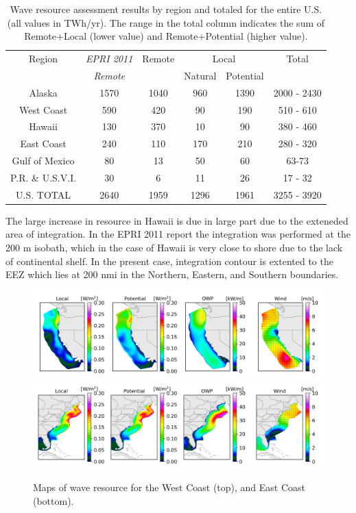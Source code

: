 \begin{table}[ht]
  \centering
  \begin{tabular}{|c|c|c|c|c|c|}
    \hline
    Region & {\it EPRI 2011}  & Remote & \multicolumn{2}{c|}{Local} & Total \\
    & {\it Remote} & & Natural & Potential & \\
    \hline
    Alaska & 1570 & 1040 & 960 & 1390 & 2000 - 2430 \\
    West Coast & 590 & 420 & 90 & 190 & 510 - 610 \\
    Hawaii & 130 & 370 & 10 & 90 & 380 - 460 \\
    East Coast & 240 & 110 & 170 & 210 & 280 - 320 \\
    Gulf of Mexico & 80 & 13 & 50 & 60 & 63-73 \\
    P.R. \& U.S.V.I. & 30 & 6 & 11 & 26 & 17 - 32 \\
    \hline \hline
U.S. TOTAL & 2640 & 1959 & 1296 & 1961 & 3255 - 3920 \\
\hline
  \end{tabular}
  \caption{Wave resource assessment results by region and totaled for the entire U.S. (all values in TWh/yr). The range in the total column indicates the sum of Remote+Local (lower value) and Remote+Potential (higher value). }
  \label{table:totals}
\end{table}

The large increase in resource in Hawaii is due in large part due to the exteneded area of integration. In the EPRI 2011 report the integration was performed at the 200 m isobath, which in the case of Hawaii is very close to shore due to the lack of continental shelf. In the present case, integration contour is extented to the EEZ which lies at 200 nmi in the Northern, Eastern, and Southern boundaries.

\begin{figure}[ht]
  \centering
  \includegraphics[width=\textwidth]{../fig/WC-Map01-November.png}
  \includegraphics[width=\textwidth]{../fig/EC-Map01-November.png}
  \caption{Maps of wave resource for the West Coast (top), and East Coast (bottom). }
  \label{fig:maps}
\end{figure}

